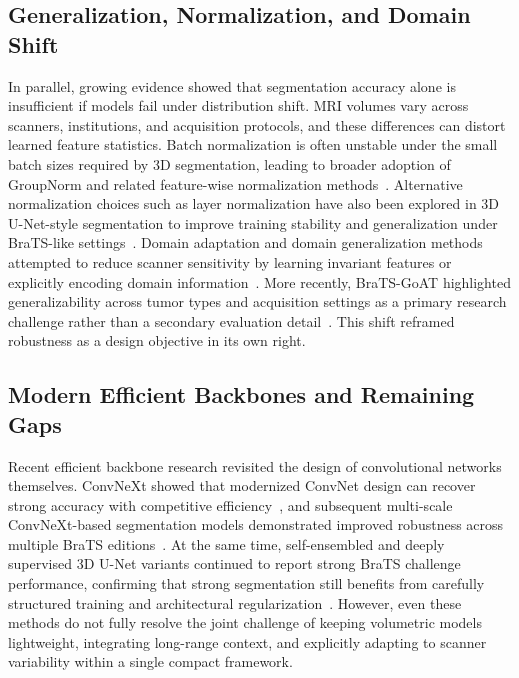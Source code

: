 \documentclass[conference]{IEEEtran}
\begin{document}
\subsection{Generalization, Normalization, and Domain Shift}

In parallel, growing evidence showed that segmentation accuracy alone is insufficient if models fail under distribution shift. MRI volumes vary across scanners, institutions, and acquisition protocols, and these differences can distort learned feature statistics. Batch normalization is often unstable under the small batch sizes required by 3D segmentation, leading to broader adoption of GroupNorm and related feature-wise normalization methods~\cite{ioffe2015batchnorm,wu2018groupnorm}. Alternative normalization choices such as layer normalization have also been explored in 3D U-Net-style segmentation to improve training stability and generalization under BraTS-like settings~\cite{rawat2022layernorm}. Domain adaptation and domain generalization methods attempted to reduce scanner sensitivity by learning invariant features or explicitly encoding domain information~\cite{ganin2016domain,kamnitsas2017unsupervised}. More recently, BraTS-GoAT highlighted generalizability across tumor types and acquisition settings as a primary research challenge rather than a secondary evaluation detail~\cite{satushe2025bratsgoat}. This shift reframed robustness as a design objective in its own right.

\subsection{Modern Efficient Backbones and Remaining Gaps}

Recent efficient backbone research revisited the design of convolutional networks themselves. ConvNeXt showed that modernized ConvNet design can recover strong accuracy with competitive efficiency~\cite{liu2022convnext}, and subsequent multi-scale ConvNeXt-based segmentation models demonstrated improved robustness across multiple BraTS editions~\cite{lopezramirez2026multiscaleconvnext}. At the same time, self-ensembled and deeply supervised 3D U-Net variants continued to report strong BraTS challenge performance, confirming that strong segmentation still benefits from carefully structured training and architectural regularization~\cite{henry2021selfensembled}. However, even these methods do not fully resolve the joint challenge of keeping volumetric models lightweight, integrating long-range context, and explicitly adapting to scanner variability within a single compact framework.
\end{document}

